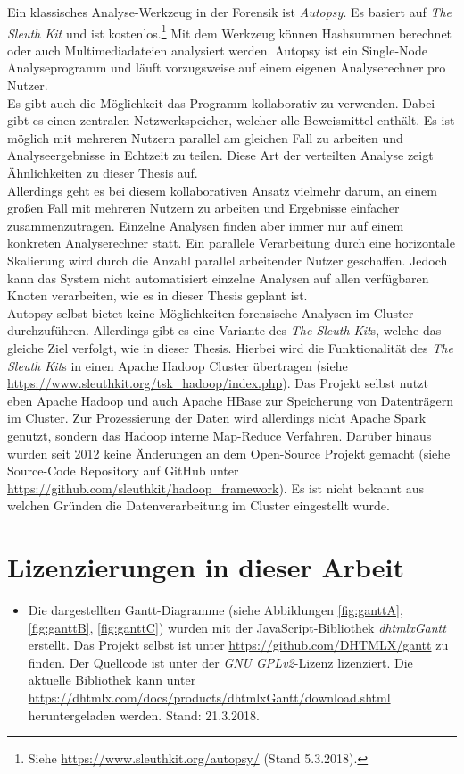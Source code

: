 \noindent
Ein klassisches Analyse-Werkzeug in der Forensik ist \textit{Autopsy}. Es basiert auf \textit{The Sleuth Kit} und ist kostenlos.\footnote{Siehe \url{https://www.sleuthkit.org/autopsy/} (Stand 5.3.2018).} Mit dem Werkzeug können Hashsummen berechnet oder auch Multimediadateien analysiert werden. Autopsy ist ein Single-Node Analyseprogramm und läuft vorzugsweise auf einem eigenen Analyserechner pro Nutzer.\\ 
Es gibt auch die Möglichkeit das Programm kollaborativ zu verwenden. Dabei gibt es einen zentralen Netzwerkspeicher, welcher alle Beweismittel enthält. Es ist möglich mit mehreren Nutzern parallel am gleichen Fall zu arbeiten und Analyseergebnisse in Echtzeit zu teilen. Diese Art der verteilten Analyse zeigt Ähnlichkeiten zu dieser Thesis auf.\\
Allerdings geht es bei diesem kollaborativen Ansatz vielmehr darum, an einem großen Fall mit mehreren Nutzern zu arbeiten und Ergebnisse einfacher zusammenzutragen. Einzelne Analysen finden aber immer nur auf einem konkreten Analyserechner statt. Ein parallele Verarbeitung durch eine horizontale Skalierung wird durch die Anzahl parallel arbeitender Nutzer geschaffen. Jedoch kann das System nicht automatisiert einzelne Analysen auf allen verfügbaren Knoten verarbeiten, wie es in dieser Thesis geplant ist.\\

\noindent
Autopsy selbst bietet keine Möglichkeiten forensische Analysen im Cluster durchzuführen. Allerdings gibt es eine Variante des \textit{The Sleuth Kit}s, welche das gleiche Ziel verfolgt, wie in dieser Thesis. Hierbei wird die Funktionalität des \textit{The Sleuth Kit}s in einen Apache Hadoop Cluster übertragen (siehe \url{https://www.sleuthkit.org/tsk_hadoop/index.php}). Das Projekt selbst nutzt eben Apache Hadoop und auch Apache HBase zur Speicherung von Datenträgern im Cluster. Zur Prozessierung der Daten wird allerdings nicht Apache Spark genutzt, sondern das Hadoop interne Map-Reduce Verfahren. Darüber hinaus wurden seit 2012 keine Änderungen an dem Open-Source Projekt gemacht (siehe Source-Code Repository auf GitHub unter \url{https://github.com/sleuthkit/hadoop_framework}). Es ist nicht bekannt aus welchen Gründen die Datenverarbeitung im Cluster eingestellt wurde.

\section{Lizenzierungen in dieser Arbeit}
\label{sec:licencing_issues}
\begin{itemize}
\item Die dargestellten Gantt-Diagramme (siehe Abbildungen \ref{fig:ganttA}, \ref{fig:ganttB}, \ref{fig:ganttC}) wurden mit der JavaScript-Bibliothek \textit{dhtmlxGantt} erstellt. Das Projekt selbst ist unter \url{https://github.com/DHTMLX/gantt} zu finden. Der Quellcode ist unter der \textit{GNU GPLv2}-Lizenz lizenziert. Die aktuelle Bibliothek kann unter \url{https://dhtmlx.com/docs/products/dhtmlxGantt/download.shtml} heruntergeladen werden. Stand: 21.3.2018.
\end{itemize}

